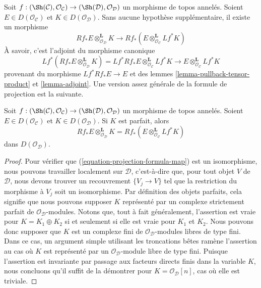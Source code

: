 \noindent
Soit $f : (\Sh(\mathcal{C}), \mathcal{O}_\mathcal{C}) \to
(\Sh(\mathcal{D}), \mathcal{O}_\mathcal{D})$ un morphisme de topos annelés.
Soient $E \in D(\mathcal{O}_\mathcal{C})$ et
$K \in D(\mathcal{O}_\mathcal{D})$. Sans aucune hypothèse supplémentaire, il
existe un morphisme
\begin{equation}
\label{equation-projection-formula-map}
Rf_*E \otimes^\mathbf{L}_{\mathcal{O}_\mathcal{D}} K
\longrightarrow
Rf_*(E \otimes^\mathbf{L}_{\mathcal{O}_\mathcal{C}} Lf^*K)
\end{equation}
À savoir, c'est l'adjoint du morphisme canonique
$$
Lf^*(Rf_*E \otimes^\mathbf{L}_{\mathcal{O}_\mathcal{D}} K) =
Lf^*Rf_*E \otimes^\mathbf{L}_{\mathcal{O}_\mathcal{C}} Lf^*K
\longrightarrow
E \otimes^\mathbf{L}_{\mathcal{O}_\mathcal{C}} Lf^*K
$$
provenant du morphisme $Lf^*Rf_*E \to E$ et des lemmes
\ref{lemma-pullback-tensor-product} et \ref{lemma-adjoint}. Une version assez
générale de la formule de projection est la suivante.

\begin{lemma}
\label{lemma-projection-formula}
Soit $f : (\Sh(\mathcal{C}), \mathcal{O}_\mathcal{C}) \to
(\Sh(\mathcal{D}), \mathcal{O}_\mathcal{D})$ un morphisme de topos annelés.
Soient $E \in D(\mathcal{O}_\mathcal{C})$ et
$K \in D(\mathcal{O}_\mathcal{D})$. Si $K$ est parfait, alors
$$
Rf_*E \otimes^\mathbf{L}_{\mathcal{O}_\mathcal{D}} K =
Rf_*(E \otimes^\mathbf{L}_{\mathcal{O}_\mathcal{C}} Lf^*K)
$$
dans $D(\mathcal{O}_\mathcal{D})$.
\end{lemma}

\begin{proof}
Pour vérifier que (\ref{equation-projection-formula-map}) est un isomorphisme,
nous pouvons travailler localement sur $\mathcal{D}$, c'est-à-dire que, pour
tout objet $V$ de $\mathcal{D}$, nous devons trouver un recouvrement
$\{V_j \to V\}$ tel que la restriction du morphisme à $V_j$ soit un
isomorphisme. Par définition des objets parfaits, cela signifie que nous
pouvons supposer $K$ représenté par un complexe strictement parfait de
$\mathcal{O}_\mathcal{D}$-modules. Notons que, tout à fait généralement,
l'assertion est vraie pour $K = K_1 \oplus K_2$ si et seulement si elle est
vraie pour $K_1$ et $K_2$. Nous pouvons donc supposer que $K$ est un complexe
fini de $\mathcal{O}_\mathcal{D}$-modules libres de type fini. Dans ce cas, un
argument simple utilisant les troncations bêtes ramène l'assertion au cas où
$K$ est représenté par un $\mathcal{O}_\mathcal{D}$-module libre de type fini.
Puisque l'assertion est invariante par passage aux facteurs directs finis
dans la variable $K$, nous concluons qu'il suffit de la démontrer pour
$K = \mathcal{O}_\mathcal{D}[n]$, cas où elle est triviale.
\end{proof}


